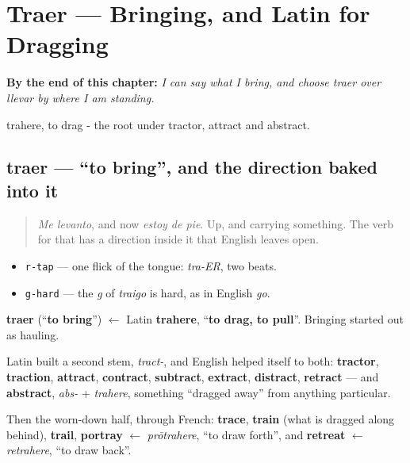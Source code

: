 
\chapter{Traer --- Bringing, and Latin for Dragging}
\label{ch:spanish-traer}

\begin{chapteropening}
\textbf{By the end of this chapter:} \emph{I can say what I bring, and choose traer over llevar by where I am standing.}

trahere, to drag - the root under tractor, attract and abstract.
\end{chapteropening}

\section[traer]{traer — \textquotedblleft{}to bring\textquotedblright{}, and the direction baked into it}

\label{lesson:ES-C39-traer}



\begin{quote}
\emph{Me levanto}, and now \emph{estoy de pie}. Up, and carrying something. The verb for that has a direction inside it that English leaves open.
\end{quote}

\begin{sounds}
\begin{itemize}
\raggedright
  \item \texttt{r-tap} — one flick of the tongue: \emph{tra-ER}, two beats.
  \item \texttt{g-hard} — the \emph{g} of \emph{traigo} is hard, as in English \emph{go}.
\end{itemize}
\end{sounds}

\begin{cousinweb}
\textbf{traer} (\textquotedblleft{}\textbf{to bring}\textquotedblright{}) $\leftarrow$ Latin \textbf{trahere}, \textquotedblleft{}\textbf{to drag, to pull}\textquotedblright{}. Bringing started out as hauling.

Latin built a second stem, \emph{tract-}, and English helped itself to both: \textbf{tractor}, \textbf{traction}, \textbf{attract}, \textbf{contract}, \textbf{subtract}, \textbf{extract}, \textbf{distract}, \textbf{retract} — and \textbf{abstract}, \emph{abs-} + \emph{trahere}, something \textquotedblleft{}dragged away\textquotedblright{} from anything particular.

Then the worn-down half, through French: \textbf{trace}, \textbf{train} (what is dragged along behind), \textbf{trail}, \textbf{portray} $\leftarrow$ \emph{prōtrahere}, \textquotedblleft{}to draw forth\textquotedblright{}, and \textbf{retreat} $\leftarrow$ \emph{retrahere}, \textquotedblleft{}to draw back\textquotedblright{}.
\end{cousinweb}

